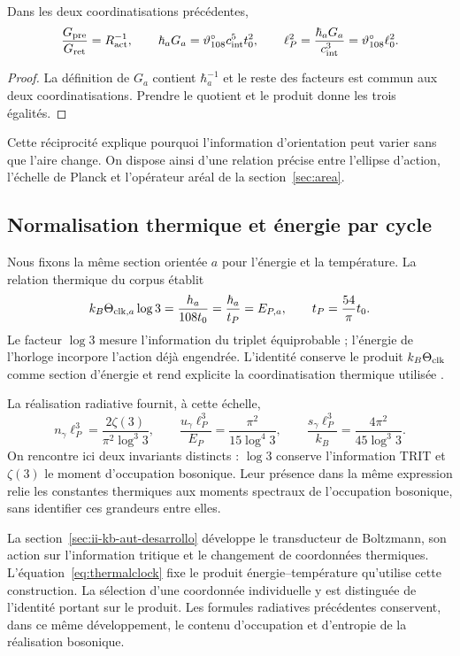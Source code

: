 \begin{proposition}
Dans les deux coordinatisations précédentes,
\[
\frac{G_{\rm pre}}{G_{\rm ret}}=R_{\rm act}^{-1},\qquad
\hbar_aG_a=\vartheta^\circ_{108}c_{\rm int}^5t_0^2,
\qquad
\ell_P^2=\frac{\hbar_aG_a}{c_{\rm int}^3}
=\vartheta^\circ_{108}\ell_0^2.
\]
\end{proposition}
\begin{proof}
La définition de $G_a$ contient $\hbar_a^{-1}$ et le reste des facteurs
est commun aux deux coordinatisations. Prendre le quotient et le produit donne
les trois égalités.
\end{proof}
Cette réciprocité explique pourquoi l'information d'orientation peut
varier sans que l'aire change. On dispose ainsi d'une relation précise
entre l'ellipse d'action, l'échelle de Planck et l'opérateur aréal
de la section~\ref{sec:area}.

\subsection{Normalisation thermique et énergie par cycle}
Nous fixons la même section orientée \(a\) pour l’énergie et la
température. La relation thermique du corpus établit
\begin{equation}
k_B\Theta_{{\rm clk},a}\log3
=\frac{h_a}{108t_0}
=\frac{\hbar_a}{t_P}=E_{P,a},
\qquad t_P=\frac{54}{\pi}t_0.
\label{eq:thermalclock}
\end{equation}
Le facteur $\log3$ mesure l’information du triplet équiprobable ;
l’énergie de l’horloge incorpore l’action déjà engendrée.
L’identité conserve le produit $k_B\Theta_{\rm clk}$ comme section
d’énergie et rend explicite la coordinatisation thermique utilisée \cite{termica}.

La réalisation radiative fournit, à cette échelle,
\[
n_\gamma\ell_P^3=\frac{2\zeta(3)}{\pi^2\log^3 3},\qquad
\frac{u_\gamma\ell_P^3}{E_P}
=\frac{\pi^2}{15\log^4 3},\qquad
\frac{s_\gamma\ell_P^3}{k_B}
=\frac{4\pi^2}{45\log^3 3}.
\]
On rencontre ici deux invariants distincts : $\log3$ conserve
l’information TRIT et $\zeta(3)$ le moment d’occupation bosonique.
Leur présence dans la même expression relie les constantes thermiques
aux moments spectraux de l’occupation bosonique, sans identifier
ces grandeurs entre elles.

La section~\ref{sec:ii-kb-aut-desarrollo} développe le transducteur
de Boltzmann, son action sur l'information tritique et le changement de
coordonnées thermiques. L'équation~\eqref{eq:thermalclock} fixe le
produit énergie--température qu'utilise cette construction.
La sélection d'une coordonnée individuelle y est distinguée de
l'identité portant sur le produit. Les formules radiatives précédentes
conservent, dans ce même développement, le contenu d'occupation et
d'entropie de la réalisation bosonique.

